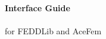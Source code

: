 \documentclass[12pt,openany,oneside,a4paper]{scrbook}
\theoremstyle{plain}
\begin{document}


\begin{titlepage}
\begin{center}
\vspace{4cm}
\LARGE {\textbf{Interface Guide}} \\
\vspace{2cm}\\
\Large {{for FEDDLib and AceFem}} \\
\begin{center}
\vfill
\end{center}

\normalsize
\end{center}
\end{titlepage}







\setlength{\parindent}{0.0pt}

\setcounter{page}{1}
%




~~~~ \\\


~~\\ 

%


%
\end{document}
